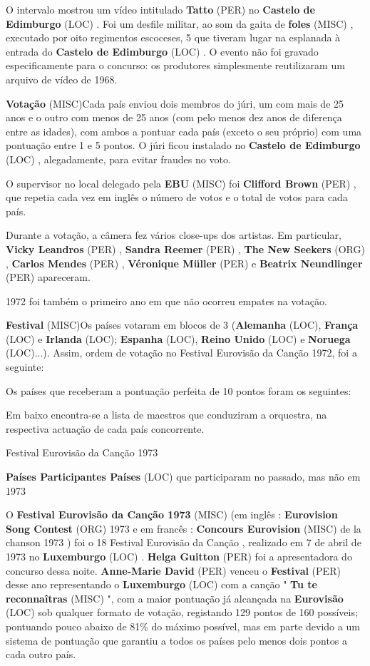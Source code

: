 \documentclass[12pt,a4paper]{article}
\begin{document}
O intervalo mostrou um vídeo intitulado \textbf{Tatto} (PER) no \textbf{Castelo de Edimburgo} (LOC) . Foi um desfile militar, ao som da gaita de \textbf{foles} (MISC) , executado por oito regimentos escoceses, 5 que tiveram lugar na esplanada à entrada do \textbf{Castelo de Edimburgo} (LOC) . O evento não foi gravado especificamente para o concurso: os produtores simplesmente reutilizaram um arquivo de vídeo de 1968.



\textbf{Votação} (MISC)Cada país enviou dois membros do júri, um com mais de 25 anos e o outro com menos de 25 anos (com pelo menos dez anos de diferença entre as idades), com ambos a pontuar cada país (exceto o seu próprio) com uma pontuação entre 1 e 5 pontos. O júri ficou instalado no \textbf{Castelo de Edimburgo} (LOC) , alegadamente, para evitar fraudes no voto.

O supervisor no local delegado pela \textbf{EBU} (MISC) foi \textbf{Clifford Brown} (PER) , que repetia cada vez em inglês o número de votos e o total de votos para cada país.

Durante a votação, a câmera fez vários close-ups dos artistas. Em particular, \textbf{Vicky Leandros} (PER) , \textbf{Sandra Reemer} (PER) , \textbf{The New Seekers} (ORG) , \textbf{Carlos Mendes} (PER) , \textbf{Véronique Müller} (PER) e \textbf{Beatrix Neundlinger} (PER) apareceram.

1972 foi também o primeiro ano em que não ocorreu empates na votação.



\textbf{Festival} (MISC)Os países votaram em blocos de 3 (\textbf{Alemanha} (LOC), \textbf{França} (LOC) e \textbf{Irlanda} (LOC); \textbf{Espanha} (LOC), \textbf{Reino Unido} (LOC) e \textbf{Noruega} (LOC)...). Assim, ordem de votação no Festival Eurovisão da Canção 1972, foi a seguinte:

Os países que receberam a pontuação perfeita de 10 pontos foram os seguintes:

Em baixo encontra-se a lista de maestros que conduziram a orquestra, na respectiva actuação de cada país concorrente.



Festival Eurovisão da Canção 1973



\textbf{Países Participantes Países} (LOC) que participaram no passado, mas não em 1973

O \textbf{Festival Eurovisão da Canção 1973} (MISC) (em inglês : \textbf{Eurovision Song Contest} (ORG) 1973 e em francês : \textbf{Concours Eurovision} (MISC) de la chanson 1973 ) foi o 18 Festival Eurovisão da Canção , realizado em 7 de abril de 1973 no \textbf{Luxemburgo} (LOC) . \textbf{Helga Guitton} (PER) foi a apresentadora do concurso dessa noite. \textbf{Anne-Marie David} (PER) venceu o \textbf{Festival} (PER) desse ano representando o \textbf{Luxemburgo} (LOC) com a canção " \textbf{Tu te reconnaîtras} (MISC) ", com a maior pontuação já alcançada na \textbf{Eurovisão} (LOC) sob qualquer formato de votação, registando 129 pontos de 160 possíveis; pontuando pouco abaixo de 81\% do máximo possível, mas em parte devido a um sistema de pontuação que garantiu a todos os países pelo menos dois pontos a cada outro país.
\end{document}
